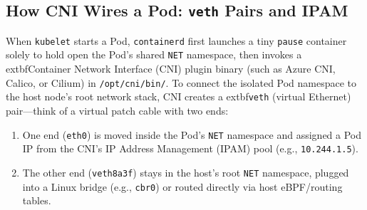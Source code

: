 \subsection{How CNI Wires a Pod: \texttt{veth} Pairs and IPAM}
When \texttt{kubelet} starts a Pod, \texttt{containerd} first launches a tiny \texttt{pause} container solely to hold open the Pod's shared \texttt{NET} namespace, then invokes a 	extbf{Container Network Interface (CNI)} plugin binary (such as Azure CNI, Calico, or Cilium) in \texttt{/opt/cni/bin/}. To connect the isolated Pod namespace to the host node's root network stack, CNI creates a 	extbf{\texttt{veth} (virtual Ethernet) pair}---think of a virtual patch cable with two ends:
\begin{enumerate}[leftmargin=15pt]
  \item One end (\texttt{eth0}) is moved inside the Pod's \texttt{NET} namespace and assigned a Pod IP from the CNI's IP Address Management (IPAM) pool (e.g., \texttt{10.244.1.5}).
  \item The other end (\texttt{veth8a3f}) stays in the host's root \texttt{NET} namespace, plugged into a Linux bridge (e.g., \texttt{cbr0}) or routed directly via host eBPF/routing tables.
\end{enumerate}

